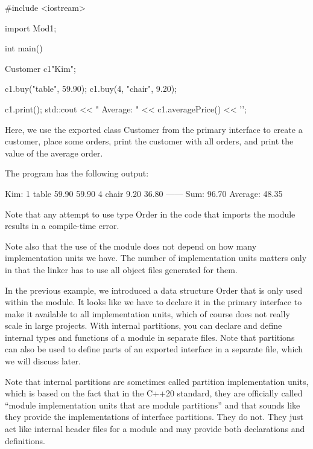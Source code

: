 \begin{cpp}
#include <iostream>

import Mod1;

int main()
{
	Customer c1{"Kim"};
	
	c1.buy("table", 59.90);
	c1.buy(4, "chair", 9.20);
	
	c1.print();
	std::cout << " Average: " << c1.averagePrice() << '\n';
}
\end{cpp}

Here, we use the exported class Customer from the primary interface to create a customer, place some orders, print the customer with all orders, and print the value of the average order.

The program has the following output:

\begin{shell}
Kim:
  1 table        59.90   59.90
  4 chair         9.20   36.80
                        ------
    Sum:                 96.70
Average: 48.35
\end{shell}

Note that any attempt to use type Order in the code that imports the module results in a compile-time error.

Note also that the use of the module does not depend on how many implementation units we have. The number of implementation units matters only in that the linker has to use all object files generated for them.


In the previous example, we introduced a data structure Order that is only used within the module. It looks like we have to declare it in the primary interface to make it available to all implementation units, which of course does not really scale in large projects. With internal partitions, you can declare and define internal types and functions of a module in separate files. Note that partitions can also be used to define parts of an exported interface in a separate file, which we will discuss later.

Note that internal partitions are sometimes called partition implementation units, which is based on the fact that in the C++20 standard, they are officially called “module implementation units that are module partitions” and that sounds like they provide the implementations of interface partitions. They do not. They just act like internal header files for a module and may provide both declarations and definitions.



